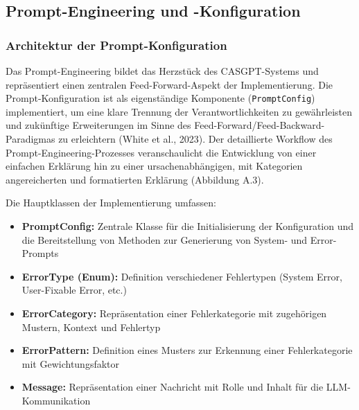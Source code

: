 \documentclass[
  a4paper,
  12pt,
  oneside,
  open=any,
  BCOR=12mm,
  DIV=14,
  parskip=half*,
  headsepline,
  footsepline,
  pointlessnumbers,
  liststotoc,
  numbers=noenddot,
  listof=totoc]{scrartcl}
\begin{document}
\subsection{Prompt-Engineering und
-Konfiguration}\label{prompt-engineering-und--konfiguration}

\subsubsection{Architektur der
Prompt-Konfiguration}\label{architektur-der-prompt-konfiguration}

Das Prompt-Engineering bildet das Herzstück des CASGPT-Systems und
repräsentiert einen zentralen Feed-Forward-Aspekt der Implementierung.
Die Prompt-Konfiguration ist als eigenständige Komponente
(\texttt{PromptConfig}) implementiert, um eine klare Trennung der
Verantwortlichkeiten zu gewährleisten und zukünftige Erweiterungen im
Sinne des Feed-Forward/Feed-Backward-Paradigmas zu erleichtern (White et
al., 2023). Der detaillierte Workflow des Prompt-Engineering-Prozesses
veranschaulicht die Entwicklung von einer einfachen Erklärung hin zu
einer ursachenabhängigen, mit Kategorien angereicherten und formatierten
Erklärung (Abbildung A.3).

Die Hauptklassen der Implementierung umfassen:

\begin{itemize}
\item
  \textbf{PromptConfig:} Zentrale Klasse für die Initialisierung der
  Konfiguration und die Bereitstellung von Methoden zur Generierung von
  System- und Error-Prompts
\item
  \textbf{ErrorType (Enum):} Definition verschiedener Fehlertypen
  (System Error, User-Fixable Error, etc.)
\item
  \textbf{ErrorCategory:} Repräsentation einer Fehlerkategorie mit
  zugehörigen Mustern, Kontext und Fehlertyp
\item
  \textbf{ErrorPattern:} Definition eines Musters zur Erkennung einer
  Fehlerkategorie mit Gewichtungsfaktor
\item
  \textbf{Message:} Repräsentation einer Nachricht mit Rolle und Inhalt
  für die LLM-Kommunikation
\end{itemize}
\end{document}
